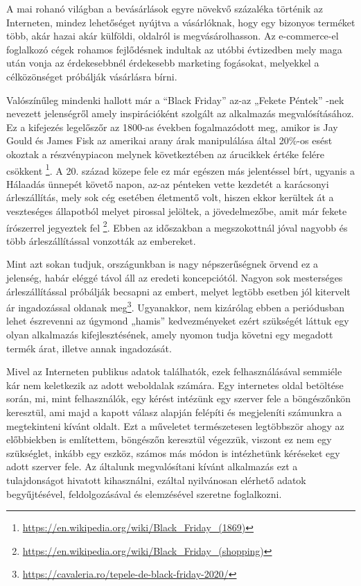 A mai rohanó világban a bevásárlások egyre növekvő százaléka történik az Interneten, mindez lehetőséget nyújtva a vásárlóknak, hogy egy bizonyos terméket több, akár hazai akár külföldi, oldalról is megvásárolhasson. Az e-commerce-el foglalkozó cégek rohamos fejlődésnek indultak az utóbbi évtizedben mely maga után vonja az érdekesebbnél érdekesebb marketing fogásokat, melyekkel a célközönséget próbálják vásárlásra bírni.

Valószínűleg mindenki hallott már a “Black Friday” az-az „Fekete Péntek” -nek nevezett jelenségről amely inspirációként szolgált az alkalmazás megvalósításához. Ez a kifejezés legelőszőr az 1800-as években fogalmazódott meg, amikor is Jay Gould és James Fisk az amerikai arany árak manipulálása által 20\%-os esést okoztak a részvénypiacon melynek következtében az árucikkek értéke felére csökkent \footnote{\url{https://en.wikipedia.org/wiki/Black_Friday_(1869)}}. A 20. század közepe fele ez már egészen más jelentéssel bírt, ugyanis a Hálaadás ünnepét követő napon, az-az pénteken vette kezdetét a karácsonyi árleszállítás, mely sok cég esetében életmentő volt, hiszen ekkor kerültek át a veszteséges állapotból melyet pirossal jelöltek, a jövedelmezőbe, amit már fekete írószerrel jegyeztek fel \footnote{\url{https://en.wikipedia.org/wiki/Black_Friday_(shopping)}}. Ebben az időszakban a megszokottnál jóval nagyobb és több árleszállítással vonzották az embereket.

Mint azt sokan tudjuk, országunkban is nagy népszerűségnek örvend ez a jelenség, habár eléggé távol áll az eredeti koncepciótól. Nagyon sok mesterséges árleszállítással próbálják becsapni az embert, melyet legtöbb esetben jól kitervelt ár ingadozással oldanak meg\footnote{\url{https://cavaleria.ro/tepele-de-black-friday-2020/}}. Ugyanakkor, nem kizárólag ebben a periódusban lehet észrevenni az úgymond „hamis” kedvezményeket ezért szükségét láttuk egy olyan alkalmazás kifejlesztésének, amely nyomon tudja követni egy megadott termék árat, illetve annak ingadozását.

Mivel az Interneten publikus adatok találhatók, ezek felhasználásával semmiéle kár nem keletkezik az adott weboldalak számára. Egy internetes oldal betöltése során, mi, mint felhasználók, egy kérést intézünk egy szerver fele a böngészőnkön keresztül, ami majd a kapott válasz alapján felépíti és megjeleníti számunkra a megtekinteni kívánt oldalt. Ezt a műveletet természetesen legtöbbször ahogy az előbbiekben is említettem, böngészőn keresztül végezzük, viszont ez nem egy szükséglet, inkább egy eszköz, számos más módon is intézhetünk kéréseket egy adott szerver fele. Az általunk megvalósítani kívánt alkalmazás ezt a tulajdonságot hivatott kihasználni, ezáltal nyilvánosan elérhető adatok begyűjtésével, feldolgozásával és elemzésével szeretne foglalkozni.
